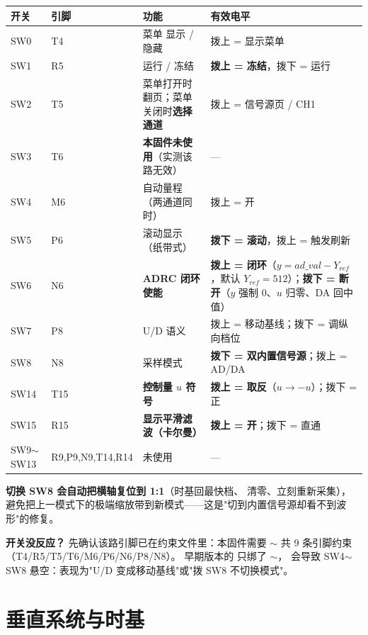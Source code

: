 \documentclass[UTF8,a4paper,11pt]{ctexart}
\begin{document}
\begin{center}
\small
\begin{tabular}{llll}
\toprule
开关 & 引脚 & 功能 & 有效电平\\
\midrule
SW0 & T4 & 菜单 显示 / 隐藏 & 拨上 = 显示菜单\\
SW1 & R5 & 运行 / 冻结 & \textbf{拨上 = 冻结}，拨下 = 运行\\
SW2 & T5 & 菜单打开时翻页；菜单关闭时\textbf{选择通道} & 拨上 = 信号源页 / CH1\\
SW3 & T6 & \textbf{本固件未使用}（实测该路无效） & —\\
SW4 & M6 & 自动量程（两通道同时） & 拨上 = 开\\
SW5 & P6 & 滚动显示（纸带式） & \textbf{拨下 = 滚动}，拨上 = 触发刷新\\
SW6 & N6 & \textbf{ADRC 闭环使能} & \textbf{拨上 = 闭环}（$y=ad\_val-Y_{ref}$，默认 $Y_{ref}=512$）；\textbf{拨下 = 断开}（$y$ 强制 0、$u$ 归零、DA 回中值）\\
SW7 & P8 & U/D 语义 & 拨上 = 移动基线；拨下 = 调纵向档位\\
SW8 & N8 & 采样模式 & \textbf{拨下 = 双内置信号源}；拨上 = AD/DA\\
SW14 & T15 & \textbf{控制量 $u$ 符号} & \textbf{拨上 = 取反}（$u\to-u$）；拨下 = 正\\
SW15 & R15 & \textbf{显示平滑滤波（卡尔曼）} & \textbf{拨上 = 开}；拨下 = 直通\\
SW9$\sim$SW13 & R9,P9,N9,T14,R14 & 未使用 & —\\
\bottomrule
\end{tabular}
\end{center}

\begin{tipbox}
\textbf{切换 SW8 会自动把横轴复位到 1:1}（时基回最快档、 清零、立刻重新采集），
避免把上一模式下的极端缩放带到新模式——这是"切到内置信号源却看不到波形"的修复。
\end{tipbox}

\begin{tipbox}
\textbf{开关没反应？} 先确认该路引脚已在约束文件里：本固件需要
$\sim$ 共 9 条引脚约束（T4/R5/T5/T6/M6/P6/N6/P8/N8）。
早期版本的  只绑了 $\sim$，
会导致 SW4$\sim$SW8 悬空：表现为"U/D 变成移动基线"或"拨 SW8 不切换模式"。
\end{tipbox}

\section{垂直系统与时基}
\end{document}
